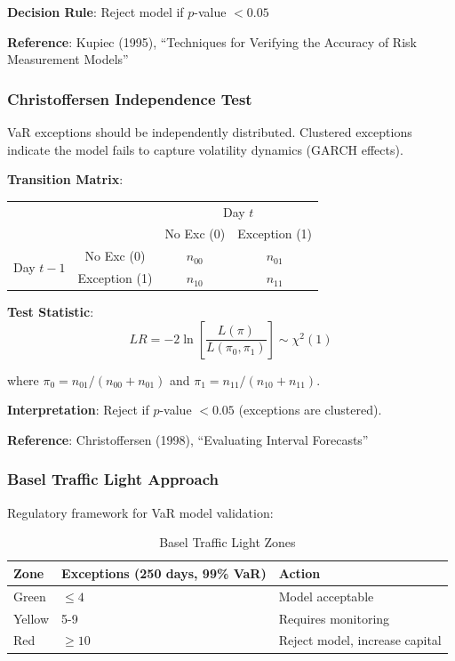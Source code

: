 \documentclass[12pt,a4paper]{article}
\begin{document}
\textbf{Decision Rule}: Reject model if $p$-value $< 0.05$

\textbf{Reference}: Kupiec (1995), ``Techniques for Verifying the Accuracy of Risk Measurement Models''

\subsubsection{Christoffersen Independence Test}

VaR exceptions should be independently distributed. Clustered exceptions indicate the model fails to capture volatility dynamics (GARCH effects).

\textbf{Transition Matrix}:
\begin{table}[H]
\centering
\begin{tabular}{cc|cc}
& & \multicolumn{2}{c}{Day $t$} \\
& & No Exc (0) & Exception (1) \\ \hline
\multirow{2}{*}{Day $t-1$} & No Exc (0) & $n_{00}$ & $n_{01}$ \\
& Exception (1) & $n_{10}$ & $n_{11}$ \\
\end{tabular}
\end{table}

\textbf{Test Statistic}:
\begin{equation}
LR = -2 \ln \left[ \frac{L(\pi)}{L(\pi_0, \pi_1)} \right] \sim \chi^2(1)
\end{equation}

where $\pi_0 = n_{01}/(n_{00}+n_{01})$ and $\pi_1 = n_{11}/(n_{10}+n_{11})$.

\textbf{Interpretation}: Reject if $p$-value $< 0.05$ (exceptions are clustered).

\textbf{Reference}: Christoffersen (1998), ``Evaluating Interval Forecasts''

\subsubsection{Basel Traffic Light Approach}

Regulatory framework for VaR model validation:

\begin{table}[H]
\centering
\begin{tabular}{@{}lll@{}}
\toprule
\textbf{Zone} & \textbf{Exceptions (250 days, 99\% VaR)} & \textbf{Action} \\ \midrule
Green & $\leq 4$ & Model acceptable \\
Yellow & 5-9 & Requires monitoring \\
Red & $\geq 10$ & Reject model, increase capital \\ \bottomrule
\end{tabular}
\caption{Basel Traffic Light Zones}
\end{table}
\end{document}
